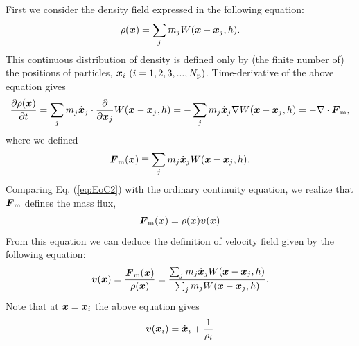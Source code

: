 \documentclass{cjour}
\newcommand{ \Vec   }[1]{ \mbox{\boldmath $ #1 $} }
\newcommand{ \PD    }[2]{ \frac{ \partial #1 }{ \partial #2 } }
\begin{document}
\begin{article}
First we consider the density field expressed in the 
following equation: 
\begin{equation}
                 \rho(\Vec{x}) = 
                 \sum_{j} m_{j} W(\Vec{x} - \Vec{x}_{j} , h ).
                                                    \label{eq:Dsph1}
\end{equation}
This continuous distribution of density is defined only by 
(the finite number of) the positions of particles, 
$\Vec{x}_i~(i=1,2,3,...,N_{\rm p})$. 
Time-derivative of the above equation gives 
\begin{equation}
              \PD{ \rho(\Vec{x}) }{ t } 
            =   \sum_{j} m_{j} \dot{ \Vec{x}}_j \cdot \PD{}{\Vec{x}_j}
                                    W(\Vec{x} - \Vec{x}_{j} , h ) 
            = - \sum_{j} m_{j} \dot{ \Vec{x}}_j 
                             \nabla W(\Vec{x} - \Vec{x}_{j} , h )  
            = - \nabla \cdot \Vec{F}_{\rm m} , 
                                                   \label{eq:EoC2}
\end{equation}
where we defined 
\begin{equation}
            \Vec{F}_{\rm m}(\Vec{x}) \equiv 
                              \sum_{j} m_{j} \dot{ \Vec{x}}_j 
                              W(\Vec{x} - \Vec{x}_{j} , h ) . 
\end{equation}
Comparing Eq. (\ref{eq:EoC2}) with the ordinary continuity equation, 
we realize that $\Vec{F}_{\rm m}$ defines the mass flux, 
\begin{equation}
              \Vec{F}_{\rm m} (\Vec{x}) 
            = \rho(\Vec{x}) \Vec{v}(\Vec{x}) 
                                                    \label{eq:DoM}
\end{equation}
From this equation we can deduce the definition of velocity field 
given by the following equation: 
\begin{equation}
              \Vec{v}(\Vec{x})
            = \frac{ \Vec{F}_{\rm m}(\Vec{x}) }{\rho(\Vec{x})}
            = \frac{ \sum_{j} m_{j} \dot{ \Vec{x}}_j 
                              W(\Vec{x} - \Vec{x}_{j} , h ) }  
                   {\sum_{j} m_{j} W(\Vec{x} - \Vec{x}_{j} , h )} .
                                                     \label{eq:Dov}
\end{equation}
Note that at $\Vec{x}=\Vec{x}_i$ the above equation gives 
\begin{equation}
              \Vec{v}(\Vec{x}_i)
            = \dot{\Vec{x}}_i 
              + \frac{1}{\rho_i}

\end{equation}
\end{article}
\end{document}
